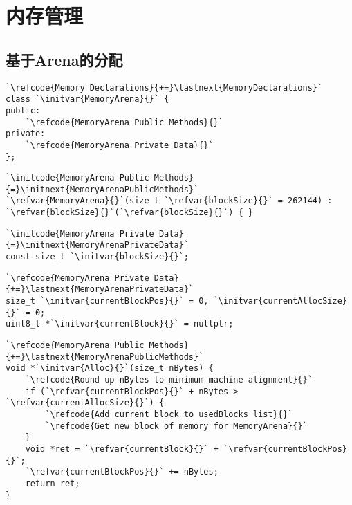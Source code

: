 \section{内存管理}\label{sec:内存管理}

\subsection{基于Arena的分配}\label{sub:基于Arena的分配}
\begin{lstlisting}
`\refcode{Memory Declarations}{+=}\lastnext{MemoryDeclarations}`
class `\initvar{MemoryArena}{}` {
public:
    `\refcode{MemoryArena Public Methods}{}`
private:
    `\refcode{MemoryArena Private Data}{}`
};
\end{lstlisting}

\begin{lstlisting}
`\initcode{MemoryArena Public Methods}{=}\initnext{MemoryArenaPublicMethods}`
`\refvar{MemoryArena}{}`(size_t `\refvar{blockSize}{}` = 262144) : `\refvar{blockSize}{}`(`\refvar{blockSize}{}`) { }
\end{lstlisting}

\begin{lstlisting}
`\initcode{MemoryArena Private Data}{=}\initnext{MemoryArenaPrivateData}`
const size_t `\initvar{blockSize}{}`;
\end{lstlisting}

\begin{lstlisting}
`\refcode{MemoryArena Private Data}{+=}\lastnext{MemoryArenaPrivateData}`
size_t `\initvar{currentBlockPos}{}` = 0, `\initvar{currentAllocSize}{}` = 0;
uint8_t *`\initvar{currentBlock}{}` = nullptr;
\end{lstlisting}

\begin{lstlisting}
`\refcode{MemoryArena Public Methods}{+=}\lastnext{MemoryArenaPublicMethods}`
void *`\initvar{Alloc}{}`(size_t nBytes) {
    `\refcode{Round up nBytes to minimum machine alignment}{}`
    if (`\refvar{currentBlockPos}{}` + nBytes > `\refvar{currentAllocSize}{}`) {
        `\refcode{Add current block to usedBlocks list}{}`
        `\refcode{Get new block of memory for MemoryArena}{}`
    }
    void *ret = `\refvar{currentBlock}{}` + `\refvar{currentBlockPos}{}`;
    `\refvar{currentBlockPos}{}` += nBytes;
    return ret;
}
\end{lstlisting}